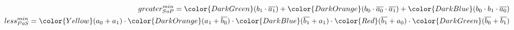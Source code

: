 \begin{align*}
greater_{SoP}^{min}={\color{DarkGreen}(b_1\cdot \overline{a_1})}+{\color{DarkOrange}(b_0 \cdot \overline{a_0} \cdot \overline{a_1})}+{\color{DarkBlue}(b_0 \cdot b_1\cdot \overline{a_0})}\\

less_{PoS}^{min}={\color{Yellow}(a_0+a_1)}\cdot{\color{DarkOrange}(a_1 + \overline{b_0})}\cdot{\color{DarkBlue}(\overline{b_1} + a_1)}\cdot{\color{Red}(\overline{b_1} + a_0)}\cdot{\color{DarkGreen}(\overline{b_0} + \overline{b_1})}
\end{align*}